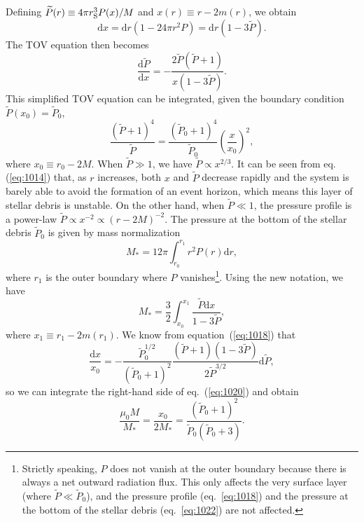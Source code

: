 \documentclass[useAMS,usenatbib]{mn2e}
\def\d{{\mathrm{d}}}
\def\tp{\widetilde{P}}
\begin{document}
Defining $\tp(r)\equiv 4\pi r_{\rm S}^3 P(x)/M$ and $x(r) \equiv r - 
2m(r)$, we obtain
\begin{equation}
  \label{eq:1014}
  \d x = \d r (1 - 24\pi r^2 P) = \d r (1 - 3 \tp).
\end{equation}
The TOV equation then becomes
\begin{equation}
  \label{eq:1013}
  \frac{\d \tp}{\d x} = -\frac{2\tp (\tp + 1)}{x(1 - 3\tp)}.
\end{equation}
This simplified TOV equation can be integrated, given the boundary
condition 
$\tp(x_0) = \tp_0$,
\begin{equation}
  \label{eq:1018}
  \frac{(\tp + 1)^4}{\tp} = \frac{(\tp_0 + 1)^4}{\tp_0} \left(\frac{x}{x_0}\right)^2,
\end{equation}
where  $x_0 \equiv r_0 - 2M$. When $\tp \gg 1$, we have $\tp\propto
x^{2/3}$. It can be seen from eq. (\ref{eq:1014}) that, as $r$
increases, both $x$ and $\tp$ decrease rapidly and the system is
barely able to avoid the formation of an event horizon, which means
this layer of stellar debris is unstable. On the other hand, 
when $\tp \ll 1$, the pressure profile is a power-law $\tp \propto
x^{-2} \propto (r-2M)^{-2}$. The pressure at the bottom of the stellar debris
$\tp_0$ is given by mass normalization 
\begin{equation}
  \label{eq:1019}
 M_* = 12\pi \int_{r_0}^{r_1} r^2 P(r) \d r,
\end{equation}
where $r_1$ is the outer boundary where $P$ vanishes\footnote{Strictly
  speaking, $P$ does not vanish at the outer boundary because
  there is always a net outward radiation flux. This only
  affects the very surface layer (where $\tp\ll\tp_0$), and the
  pressure profile (eq.~\ref{eq:1018}) and the pressure at the bottom
  of the stellar debris (eq.~\ref{eq:1022}) are not affected.}. Using the 
new notation, we have
\begin{equation}
  \label{eq:1020}
  M_* = \frac{3}{2}\int_{x_0}^{x_1} \frac{\tp \d x}{1 - 3\tp},
\end{equation}
where $x_1 \equiv r_1 - 2m(r_1)$. We know from
equation~(\ref{eq:1018}) that 
\begin{equation}
  \label{eq:1021}
  \frac{\d x}{x_0} = -\frac{\tp_0^{1/2}}{(\tp_0+1)^2} \frac{(\tp
    +1)(1 - 3\tp)}{2\tp^{3/2}} \d \tp,
\end{equation}
so we can integrate the right-hand side of eq.~(\ref{eq:1020}) and obtain
\begin{equation}
  \label{eq:1022}
  \frac{\mu_0 M}{M_*} = \frac{x_0}{2M_*} = \frac{(\tp_0 + 1)^2}{\tp_0
    (\tp_0 +3)}.
\end{equation}
\end{document}
